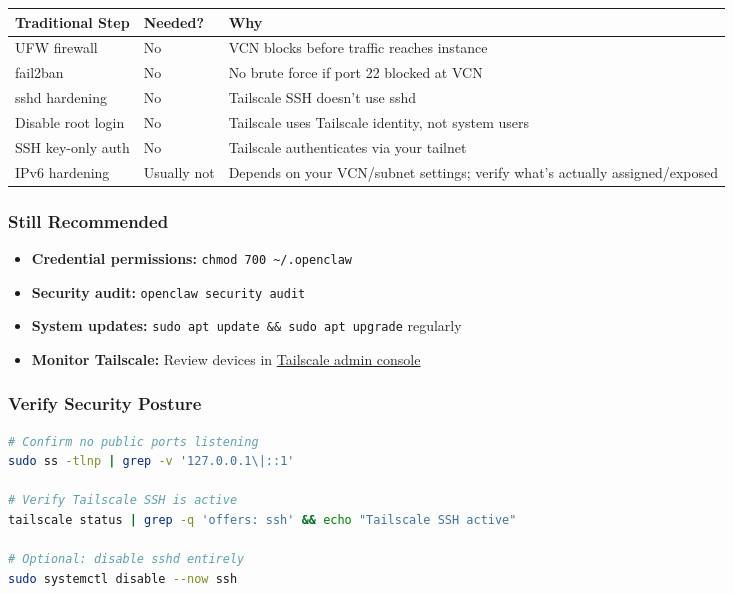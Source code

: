 \begin{table}[h]
\centering
\small
\begin{tabular}{|l|l|l|}
\hline
Traditional Step & Needed? & Why \\
\hline
UFW firewall & No & VCN blocks before traffic reaches instance \\
\hline
fail2ban & No & No brute force if port 22 blocked at VCN \\
\hline
sshd hardening & No & Tailscale SSH doesn't use sshd \\
\hline
Disable root login & No & Tailscale uses Tailscale identity, not system users \\
\hline
SSH key-only auth & No & Tailscale authenticates via your tailnet \\
\hline
IPv6 hardening & Usually not & Depends on your VCN/subnet settings; verify what’s actually assigned/exposed \\
\hline
\end{tabular}
\end{table}



\subsubsection{Still Recommended}


\begin{itemize}
  \item \textbf{Credential permissions:} \texttt{chmod 700 \textasciitilde{}/.openclaw}
  \item \textbf{Security audit:} \texttt{openclaw security audit}
  \item \textbf{System updates:} \texttt{sudo apt update \&\& sudo apt upgrade} regularly
  \item \textbf{Monitor Tailscale:} Review devices in \href{https://login.tailscale.com/admin}{Tailscale admin console}
\end{itemize}


\subsubsection{Verify Security Posture}


\begin{lstlisting}[language=bash]
# Confirm no public ports listening
sudo ss -tlnp | grep -v '127.0.0.1\|::1'

# Verify Tailscale SSH is active
tailscale status | grep -q 'offers: ssh' && echo "Tailscale SSH active"

# Optional: disable sshd entirely
sudo systemctl disable --now ssh
\end{lstlisting}


